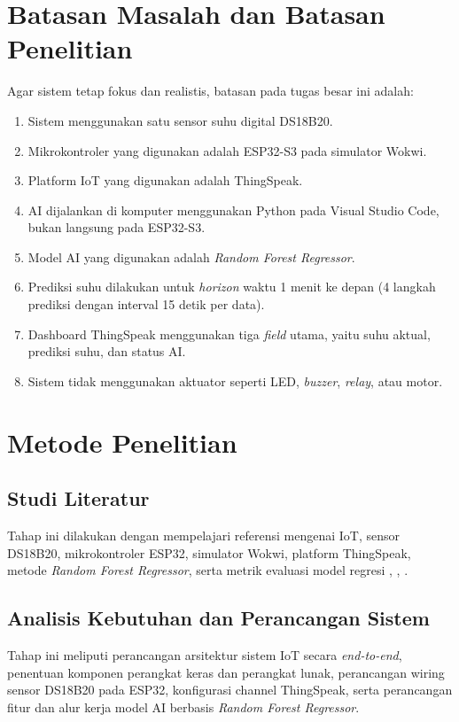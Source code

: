 \section{Batasan Masalah dan Batasan Penelitian}

Agar sistem tetap fokus dan realistis, batasan pada tugas besar ini adalah:

\begin{enumerate}
    \item Sistem menggunakan satu sensor suhu digital DS18B20.
    \item Mikrokontroler yang digunakan adalah ESP32-S3 pada simulator Wokwi.
    \item Platform IoT yang digunakan adalah ThingSpeak.
    \item AI dijalankan di komputer menggunakan Python pada Visual Studio
    Code, bukan langsung pada ESP32-S3.
    \item Model AI yang digunakan adalah \textit{Random Forest Regressor}.
    \item Prediksi suhu dilakukan untuk \textit{horizon} waktu 1 menit ke
    depan (4 langkah prediksi dengan interval 15 detik per data).
    \item Dashboard ThingSpeak menggunakan tiga \textit{field} utama, yaitu
    suhu aktual, prediksi suhu, dan status AI.
    \item Sistem tidak menggunakan aktuator seperti LED, \textit{buzzer},
    \textit{relay}, atau motor.
\end{enumerate}

\section{Metode Penelitian}

\subsection{Studi Literatur}
Tahap ini dilakukan dengan mempelajari referensi mengenai IoT, sensor DS18B20,
mikrokontroler ESP32, simulator Wokwi, platform ThingSpeak, metode
\textit{Random Forest Regressor}, serta metrik evaluasi model regresi
\cite{breiman2001}, \cite{sklearn_rf}, \cite{pedregosa2011}.

\subsection{Analisis Kebutuhan dan Perancangan Sistem}
Tahap ini meliputi perancangan arsitektur sistem IoT secara \textit{end-to-end},
penentuan komponen perangkat keras dan perangkat lunak, perancangan wiring
sensor DS18B20 pada ESP32, konfigurasi channel ThingSpeak, serta perancangan
fitur dan alur kerja model AI berbasis \textit{Random Forest Regressor}.

